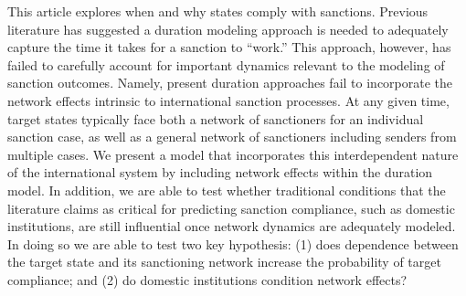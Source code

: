 This article explores when and why states comply with sanctions. Previous literature has suggested a duration modeling approach is needed to adequately capture the time it takes for a sanction to ``work.'' This approach, however, has failed to carefully account for important dynamics relevant to the modeling of sanction outcomes. Namely, present duration approaches fail to incorporate the network effects intrinsic to international sanction processes. At any given time, target states typically face both a network of sanctioners for an individual sanction case, as well as a general network of sanctioners including senders from multiple cases. We present a model that incorporates this interdependent nature of the international system by including network effects within the duration model. In addition, we are able to test whether traditional conditions that the literature claims as critical for predicting sanction compliance, such as domestic institutions, are still influential once network dynamics are adequately modeled. In doing so we are able to test two key hypothesis: (1) does dependence between the target state and its sanctioning network increase the probability of target compliance; and (2) do domestic institutions condition network effects?